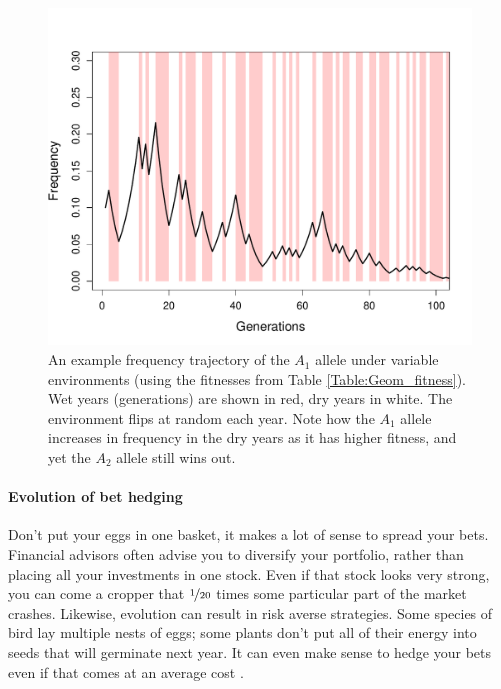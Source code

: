 \begin{figure}
\begin{center}
\includegraphics[width= \textwidth]{figures/Haploid_geom_traj.pdf}
\end{center}
\caption{An example frequency trajectory of the $A_1$ allele under
  variable environments (using the fitnesses from Table
  \ref{Table:Geom_fitness}). Wet years (generations) are shown in red, dry
  years in white. The environment flips at random each year.  Note how the $A_1$ allele increases in frequency in
  the dry years as it has higher fitness, and yet the $A_2$ allele
  still wins out. 
  } \label{fig:haploid_geo}
\end{figure}

\paragraph{Evolution of bet hedging}


Don't put your eggs in one basket, it makes a lot of sense to spread
your bets. Financial advisors often advise you to diversify your
portfolio, rather than placing all your investments in one stock. Even
if that stock looks very strong, you can come a cropper that
$\nicefrac{1}{20}$ times some particular part of the market
crashes. Likewise, evolution can result in risk averse
strategies. Some species of bird lay multiple nests of eggs; some
plants don't put all of their energy into seeds that will germinate next year. It can
even make sense to hedge your bets even if that comes at an average
cost \citep{seger1987oxford}.

